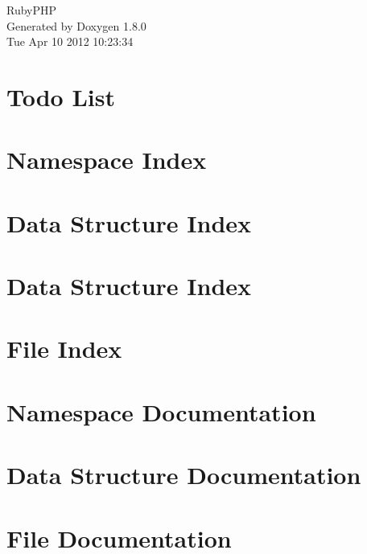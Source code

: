 \documentclass{book}
\begin{document}
\hypersetup{pageanchor=false,citecolor=blue}
\begin{titlepage}
\vspace*{7cm}
\begin{center}
{\Large Ruby\-P\-H\-P }\\
\vspace*{1cm}
{\large Generated by Doxygen 1.8.0}\\
\vspace*{0.5cm}
{\small Tue Apr 10 2012 10:23:34}\\
\end{center}
\end{titlepage}
\clearemptydoublepage
{}
\tableofcontents
\clearemptydoublepage
{}
\hypersetup{pageanchor=true,citecolor=blue}
\chapter{Todo List}
\label{todo}
\hypertarget{todo}{}

\chapter{Namespace Index}

\chapter{Data Structure Index}

\chapter{Data Structure Index}

\chapter{File Index}

\chapter{Namespace Documentation}



\chapter{Data Structure Documentation}





\chapter{File Documentation}






\printindex
\end{document}
